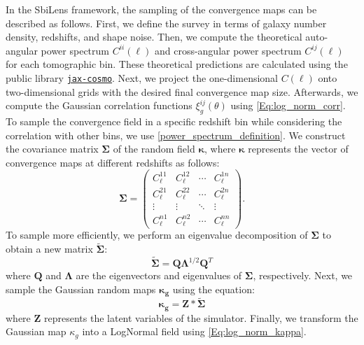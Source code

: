 \documentclass{aa}
\begin{document}
 In the SbiLens framework, the sampling of the convergence maps can be described as follows. 
First, we define the survey in terms of galaxy number density, redshifts, and shape noise.  Then, we compute the theoretical auto-angular power spectrum $C^{ii}(\ell)$ and cross-angular power spectrum $C^{ij}(\ell)$ for each tomographic bin. These theoretical predictions are calculated using the public library \href{https://github.com/DifferentiableUniverseInitiative/jax_cosmo}{\texttt{jax-cosmo}}. 
Next, we project the one-dimensional $C(\ell)$ onto two-dimensional grids with the desired final convergence map size. Afterwards, we compute the Gaussian correlation functions $\xi^{ij}_g(\theta)$ using \autoref{Eq:log_norm_corr}.
 To sample the convergence field in a specific redshift bin while considering the correlation with other bins, we use \autoref{power_spectrum_definition}. 
We construct the covariance matrix $\bm{\Sigma}$ of the random field $\bm{\kappa}$, where $\bm{\kappa}$ represents the vector of convergence maps at different redshifts as follows:
 \begin{equation}
    \bm{\Sigma}= 
    \begin{pmatrix}
    C_{\ell}^{11} & C_{\ell}^{12} & \cdots & C_{\ell}^{1n} \\
    C_{\ell}^{21} & C_{\ell}^{22} & \cdots & C_{\ell}^{2n} \\
    \vdots  & \vdots  & \ddots & \vdots  \\
    C_{\ell}^{n1} & C_{\ell}^{n2} & \cdots & C_{\ell}^{nn} 
    \end{pmatrix}.
\end{equation}
To sample more efficiently, we perform an eigenvalue decomposition of $\bm{\Sigma}$ to obtain a new matrix $\tilde{\bm{\Sigma}}$:
\begin{equation}
    \tilde{\bm{\Sigma} }=\bm{Q}\bm{\Lambda}^{1/2}\bm{Q}^{T}
\end{equation}
where $\bm{Q}$ and $\bm{\Lambda}$ are the eigenvectors and eigenvalues of $\bm{\Sigma}$, respectively.
Next, we sample the Gaussian random maps $\bm{\kappa_g}$ using the equation:
\begin{equation}
     \bm{\kappa_g}=\bm{Z}*\tilde{\bm{\Sigma} }
\end{equation}
where $\bm{Z}$ represents the latent variables of the simulator.
Finally, we transform the Gaussian map $\kappa_g$ into a LogNormal field using \autoref{Eq:log_norm_kappa}.

 
\end{document}
